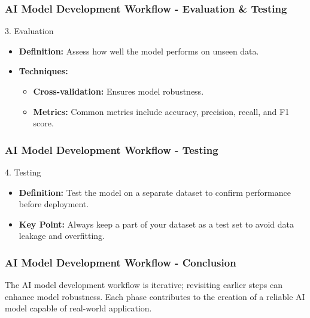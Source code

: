 \documentclass{beamer}
\begin{document}
\begin{frame}[fragile]

\frametitle{AI Model Development Workflow - Evaluation & Testing}

\begin{block}{3. Evaluation}
    \begin{itemize}
        \item \textbf{Definition:} Assess how well the model performs on unseen data.
        
        \item \textbf{Techniques:}
        \begin{itemize}
            \item \textbf{Cross-validation:} Ensures model robustness.
            \item \textbf{Metrics:} Common metrics include accuracy, precision, recall, and F1 score.
        \end{itemize}
    \end{itemize}
\end{block}

\end{frame}

\begin{frame}[fragile]

\frametitle{AI Model Development Workflow - Testing}

\begin{block}{4. Testing}
    \begin{itemize}
        \item \textbf{Definition:} Test the model on a separate dataset to confirm performance before deployment.
        
        \item \textbf{Key Point:} Always keep a part of your dataset as a test set to avoid data leakage and overfitting.
    \end{itemize}
\end{block}

\end{frame}

\begin{frame}

\frametitle{AI Model Development Workflow - Conclusion}

The AI model development workflow is iterative; revisiting earlier steps can enhance model robustness. Each phase contributes to the creation of a reliable AI model capable of real-world application.

\end{frame}
\end{document}
